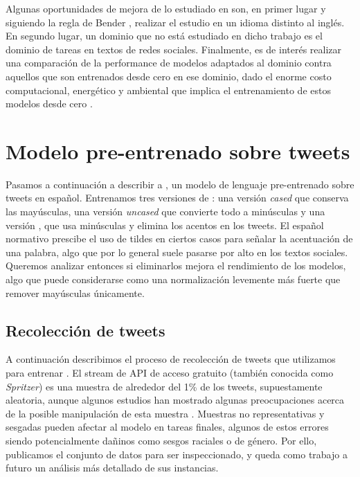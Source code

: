 Algunas oportunidades de mejora de lo estudiado en \citet{gururangan-etal-2020-dont} son, en primer lugar y siguiendo la regla de Bender \cite{bender2011achieving}, realizar el estudio en un idioma distinto al inglés. En segundo lugar, un dominio que no está estudiado en dicho trabajo es el dominio de tareas en textos de redes sociales. Finalmente, es de interés realizar una comparación de la performance de modelos adaptados al dominio contra aquellos que son entrenados desde cero en ese dominio, dado el enorme costo computacional, energético y ambiental que implica el entrenamiento de estos modelos desde cero \cite{strubell2019energy}.



\section{Modelo pre-entrenado sobre tweets}
\label{sec:robertuito_pretrained_model}

Pasamos a continuación a describir a \robertuito{}, un modelo de lenguaje pre-entrenado sobre tweets en español. Entrenamos tres versiones de \robertuito{}: una versión \emph{cased} que conserva las mayúsculas, una versión \emph{uncased} que convierte todo a minúsculas y una versión \deacc{}, que usa minúsculas y elimina los acentos en los tweets. El español normativo prescibe el uso de tildes en ciertos casos para señalar la acentuación de una palabra, algo que por lo general suele pasarse por alto en los textos sociales. Queremos analizar entonces si eliminarlos mejora el rendimiento de los modelos, algo que puede considerarse como una normalización levemente más fuerte que remover mayúsculas únicamente.



\subsection{Recolección de tweets}

\label{sec:robertuito_data_collection}

A continuación describimos el proceso de recolección de tweets que utilizamos para entrenar \robertuito{}. El stream de API de acceso gratuito (también conocida como \emph{Spritzer}) es una muestra de alrededor del 1\% de los tweets, supuestamente aleatoria, aunque algunos estudios han mostrado algunas preocupaciones acerca de la posible manipulación de esta muestra \cite{pfeffer2018tampering}. Muestras no representativas y sesgadas pueden afectar al modelo en tareas finales, algunos de estos errores siendo potencialmente dañinos como sesgos raciales o de género. Por ello, publicamos el conjunto de datos para ser inspeccionado, y queda como trabajo a futuro un análisis más detallado de sus instancias.


